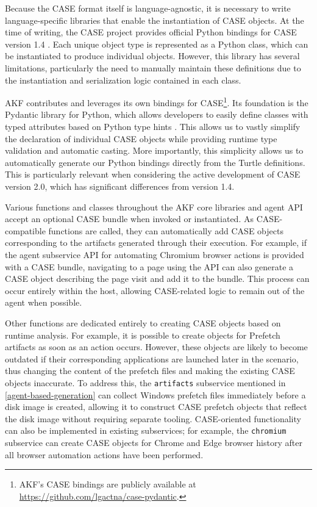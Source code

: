 \documentclass[final,5p,times,twocolumn]{elsarticle}
\newcommand{\passthrough}[1]{#1}
\begin{document}
Because the CASE format itself is language-agnostic, it is necessary to
write language-specific libraries that enable the instantiation of CASE
objects. At the time of writing, the CASE project provides official
Python bindings for CASE version 1.4
\citep{CaseworkCASEMappingPython}. Each unique object type is
represented as a Python class, which can be instantiated to produce
individual objects. However, this library has several limitations,
particularly the need to manually maintain these definitions due to the
instantiation and serialization logic contained in each class.

AKF contributes and leverages its own bindings for CASE\footnote{AKF's
  CASE bindings are publicly available at
  \url{https://github.com/lgactna/case-pydantic}.}. Its foundation is
the Pydantic library for Python, which allows developers to easily
define classes with typed attributes based on Python type hints
\citep{colvinPydantic2024}. This allows us to vastly simplify the
declaration of individual CASE objects while providing runtime type
validation and automatic casting. More importantly, this simplicity
allows us to automatically generate our Python bindings directly from
the Turtle definitions. This is particularly relevant when considering
the active development of CASE version 2.0, which has significant
differences from version 1.4.

Various functions and classes throughout the AKF core libraries and
agent API accept an optional CASE bundle when invoked or instantiated.
As CASE-compatible functions are called, they can automatically add CASE
objects corresponding to the artifacts generated through their
execution. For example, if the agent subservice API for automating
Chromium browser actions is provided with a CASE bundle, navigating to a
page using the API can also generate a CASE object describing the page
visit and add it to the bundle. This process can occur entirely within
the host, allowing CASE-related logic to remain out of the agent when
possible.

Other functions are dedicated entirely to creating CASE objects based on
runtime analysis. For example, it is possible to create objects for
Prefetch artifacts as soon as an action occurs. However, these objects
are likely to become outdated if their corresponding applications are
launched later in the scenario, thus changing the content of the
prefetch files and making the existing CASE objects inaccurate. To
address this, the \passthrough{\lstinline!artifacts!} subservice
mentioned in \autoref{agent-based-generation} can collect Windows
prefetch files immediately before a disk image is created, allowing it
to construct CASE prefetch objects that reflect the disk image without
requiring separate tooling. CASE-oriented functionality can also be
implemented in existing subservices; for example, the
\passthrough{\lstinline!chromium!} subservice can create CASE objects
for Chrome and Edge browser history after all browser automation actions
have been performed.
\end{document}
